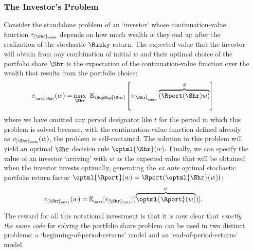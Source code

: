 \documentclass[titlepage, headings=optiontotocandhead]{Resources/texmf-local/tex/latex/econtex}
\begin{document}
\hypertarget{subsubsec:investors-problem}{}
\subsubsection{The Investor's Problem}\label{subsubsec:investors-problem}

Consider the standalone problem of an `investor' whose continuation-value function $v_{[\Shr]_\cntn}$ depends on how much wealth $\acute{w}$ they end up after the realization of the stochastic $\Risky$ return.  The expected value that the investor will obtain from any combination of initial $w$ and their optimal choice of the portfolio share $\Shr$ is the expectation of the continuation-value function over the wealth that results from the portfolio choice:
\begin{equation}\begin{gathered}\begin{aligned}
  v_{_\arvl[\Shr]}(w)  = & \max_{\Shr}~ \Ex_{\BegStp[\Shr]}\left[v_{[\Shr]_{_\cntn}}\overbrace{\left(\Rport(\Shr){w}\right)}^{\acute{w}}\right] \label{eq:vMidStpShr}
    \end{aligned}\end{gathered}\end{equation}
where we have omitted any {period} designator like $t$ for the {period} in which this problem is solved because, with the continuation-value function defined already as $v_{[\Shr]_\cntn}(\acute{w})$, the problem is self-contained.  The solution to this problem will yield an optimal $\Shr$ decision rule $\optml{\Shr}(w).$  Finally, we can specify the value of an investor `arriving' with $w$ as the expected value that will be obtained when the investor invests optimally, generating the \textit{ex ante} optimal stochastic portfolio return factor $\optml{\Rport}(w)=\Rport(\optml{\Shr}(w))$:
\begin{equation}\begin{gathered}\begin{aligned}
      v_{[\Shr]{_\arvl}}(w)  = & \Ex_{_\arvl}[v_{[\Shr]_\cntn}](\overbrace{\optml{\Rport}(w)}^{\acute{w}})].
\end{aligned}\end{gathered}\end{equation}

The reward for all this notational investment is that it is now clear that \emph{exactly the same code} for solving the portfolio share problem can be used in two distinct problems: a `beginning-of-period-returns' model and an `end-of-period-returns' model.
\end{document}
